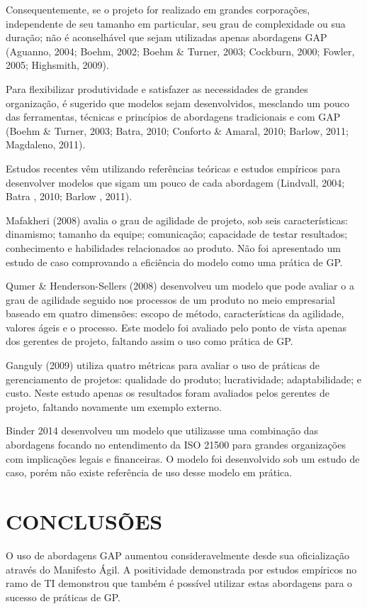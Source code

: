 Consequentemente, se o projeto for realizado em grandes corporações, independente de seu tamanho em particular, seu grau de complexidade ou sua duração; não é aconselhável que sejam utilizadas apenas abordagens GAP (Aguanno, 2004; Boehm, 2002; Boehm \& Turner, 2003; Cockburn, 2000; Fowler, 2005; Highsmith, 2009).

Para flexibilizar produtividade e satisfazer as necessidades de grandes organização, é sugerido que modelos sejam desenvolvidos, mesclando um pouco das ferramentas, técnicas e princípios de abordagens tradicionais e com GAP (Boehm \& Turner, 2003; Batra, 2010; Conforto \& Amaral, 2010; Barlow, 2011; Magdaleno, 2011).

Estudos recentes vêm utilizando referências teóricas e estudos empíricos para desenvolver modelos que sigam um pouco de cada abordagem (Lindvall, 2004; Batra , 2010; Barlow , 2011).

Mafakheri (2008) avalia o grau de agilidade de projeto, sob seis características: dinamismo; tamanho da equipe; comunicação; capacidade de testar resultados; conhecimento e habilidades relacionados ao produto. Não foi apresentado um estudo de caso comprovando a eficiência do modelo como uma prática de GP.

Qumer \& Henderson-Sellers (2008) desenvolveu um modelo que pode avaliar o a grau de agilidade seguido nos processos de um produto no meio empresarial baseado em quatro dimensões: escopo de método, características da agilidade, valores ágeis e o processo. Este modelo foi avaliado pelo ponto de vista apenas dos gerentes de projeto, faltando assim o uso como prática de GP.

Ganguly (2009) utiliza quatro métricas para avaliar o uso de práticas de gerenciamento de projetos: qualidade do produto; lucratividade; adaptabilidade; e custo. Neste estudo apenas os resultados foram avaliados pelos gerentes de projeto, faltando novamente um exemplo externo.

Binder 2014 desenvolveu um modelo que utilizasse uma combinação das abordagens focando no entendimento da ISO 21500 para grandes organizações com implicações legais e financeiras. O modelo foi desenvolvido sob um estudo de caso, porém não existe referência de uso desse modelo em prática.


\section{CONCLUSÕES}
O uso de abordagens GAP aumentou consideravelmente desde sua oficialização através do Manifesto Ágil. A positividade demonstrada por estudos empíricos no ramo de TI demonstrou que também é possível utilizar estas abordagens para o sucesso de práticas de GP.

